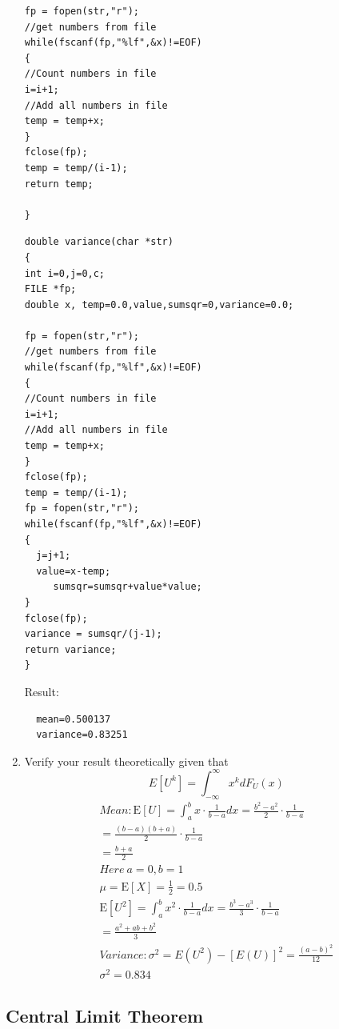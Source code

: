 \documentclass[10pt, a4paper]{article}
\providecommand{\sbrak}[1]{\ensuremath{{}\left[#1\right]}}
\begin{document}
\begin{enumerate}
\begin{lstlisting}
fp = fopen(str,"r");
//get numbers from file
while(fscanf(fp,"%lf",&x)!=EOF)
{
//Count numbers in file
i=i+1;
//Add all numbers in file
temp = temp+x;
}
fclose(fp);
temp = temp/(i-1);
return temp;

}
\end{lstlisting}
\begin{lstlisting}
double variance(char *str)
{
int i=0,j=0,c;
FILE *fp;
double x, temp=0.0,value,sumsqr=0,variance=0.0;

fp = fopen(str,"r");
//get numbers from file
while(fscanf(fp,"%lf",&x)!=EOF)
{
//Count numbers in file
i=i+1;
//Add all numbers in file
temp = temp+x;
}
fclose(fp);
temp = temp/(i-1);
fp = fopen(str,"r");
while(fscanf(fp,"%lf",&x)!=EOF)
{
  j=j+1;
  value=x-temp;
     sumsqr=sumsqr+value*value;
}
fclose(fp);
variance = sumsqr/(j-1);
return variance;
}
\end{lstlisting}
Result:
\begin{lstlisting}
  mean=0.500137 
  variance=0.83251
\end{lstlisting}
\begin{center}
\end{center}

\item Verify your result theoretically given that
%
\begin{equation}
E\sbrak{U^k} = \int_{-\infty}^{\infty}x^kdF_{U}(x)
\end{equation}
\begin{align}
Mean:
 \mathrm{E}[U]=\int_a^b x \cdot \frac{1}{b-a} d x=\frac{b^2-a^2}{2} \cdot \frac{1}{b-a} \\ =\frac{(b-a)(b+a)}{2} \cdot \frac{1}{b-a} \\=\frac{b+a}{2} 
 \\ Here \  a=0,b=1
 \\ \mu= \mathrm{E}[X]= \frac{1}{2} = 0.5
\\
 \mathrm{E}[U^2]=\int_a^b x^2 \cdot \frac{1}{b-a} d x=\frac{b^3-a^3}{3} \cdot \frac{1}{b-a} \\ =\frac{a^2+ab+b^2}{3}\\
 Variance:
 \sigma^2=E\left(U^2\right)-[E(U)]^2
 =\frac{(a-b)^2}{12}\\
  \sigma^2=0.834
\end{align}
\end{enumerate}

 \subsection{Central Limit Theorem}
 
\end{document}
